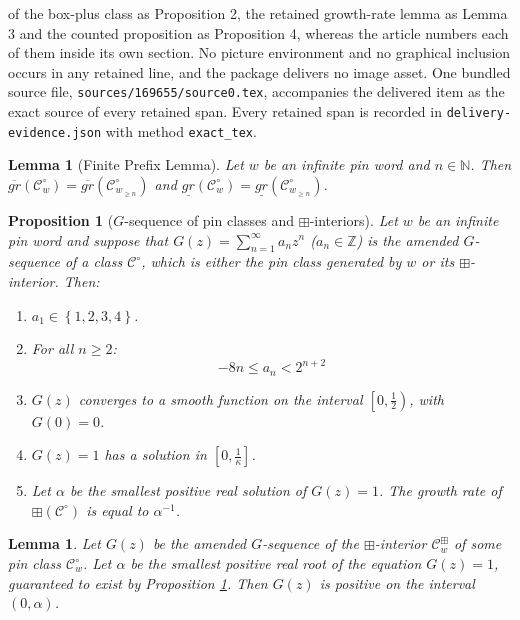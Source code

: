 \documentclass[10pt,a4paper]{amsart}
\theoremstyle{plain}
\newtheorem{prop}[thm]{Proposition}
\newtheorem{lemma}[thm]{Lemma}
\theoremstyle{definition}
\theoremstyle{remark}
\begin{document}
of the box-plus class as Proposition 2, the retained growth-rate lemma as Lemma 3 and the counted proposition as Proposition 4, whereas the article numbers each of them inside its own section. No picture environment and no graphical inclusion occurs in any retained line, and the package delivers no image asset. One bundled source file, \texttt{sources/169655/source0.tex}, accompanies the delivered item as the exact source of every retained span. Every retained span is recorded in \texttt{delivery-evidence.json} with method \texttt{exact\_tex}.
\begin{lemma}[Finite Prefix Lemma] \label{fplem}
Let $w$ be an infinite pin word and $n \in \mathbb{N}$. Then $\overline{gr}(\mathcal{C}^{\circ}_{w}) = \overline{gr}(\mathcal{C}^{\circ}_{w_{\geq n}})$ and $\underline{gr}(\mathcal{C}^{\circ}_{w}) = \underline{gr}(\mathcal{C}^{\circ}_{w_{\geq n}})$.
\end{lemma}

\begin{prop}[$G$-sequence of pin classes and $\boxplus$-interiors] \label{Gproperties}
Let $w$ be an infinite pin word and suppose that $G(z)= \sum_{n=1}^{\infty}a_{n}z^{n}$ ($a_{n} \in \mathbb{Z}$) is the amended $G$-sequence of a class $\mathcal{C}^{\circ}$, which is either the pin class generated by $w$ or its $\boxplus$-interior. Then:

\begin{enumerate}
\item $a_{1} \in \left\{1, 2, 3, 4\right\}$. \label{Gproperties1}
\item For all $n \geq 2$: \label{Gproperties2}
\[
-8n \leq a_{n} < 2^{n+2}
\]
\item $G(z)$ converges to a smooth function on the interval $\left[0,\frac{1}{2}\right)$, with $G(0) = 0$. \label{Gproperties3}
\item $G(z) = 1$ has a solution in $\left[0,\frac{1}{\kappa}\right]$. \label{Gproperties4}
\item Let $\alpha$ be the smallest positive real solution of $G(z)=1$. The growth rate of $\boxplus\left(\mathcal{C}^{\circ}\right)$ is equal to $\alpha^{-1}$. \label{Gproperties5}
\end{enumerate}

\end{prop}

\begin{lemma} \label{G+}
Let $G(z)$ be the amended $G$-sequence of the $\boxplus$-interior $\mathcal{C}^{\boxplus}_{w}$ of some pin class $\mathcal{C}^{\circ}_{w}$. Let $\alpha$ be the smallest positive real root of the equation $G(z)=1$, guaranteed to exist by Proposition \ref{Gproperties}. Then $G(z)$ is positive on the interval $(0,\alpha)$.
\end{lemma}
\end{document}
